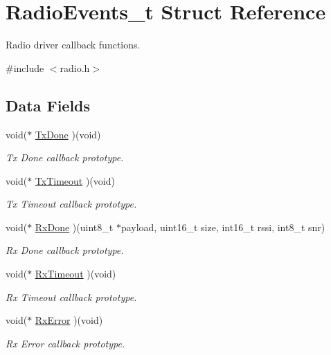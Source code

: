 \hypertarget{structRadioEvents__t}{}\section{Radio\+Events\+\_\+t Struct Reference}
\label{structRadioEvents__t}


Radio driver callback functions.  




{\ttfamily \#include $<$radio.\+h$>$}

\subsection*{Data Fields}
\begin{DoxyCompactItemize}
\item 
void($\ast$ \hyperlink{group__LORA_gafe2bdc503d6c09946dee1b800e2fb3a2}{Tx\+Done} )(void)
\begin{DoxyCompactList}\small\item\em Tx Done callback prototype. \end{DoxyCompactList}\item 
void($\ast$ \hyperlink{group__LORA_ga1f435b15ceae4ce1e44af3d3c5845ffd}{Tx\+Timeout} )(void)
\begin{DoxyCompactList}\small\item\em Tx Timeout callback prototype. \end{DoxyCompactList}\item 
void($\ast$ \hyperlink{group__LORA_ga92665b4b0a07eb2df1b435dcef314b48}{Rx\+Done} )(uint8\+\_\+t $\ast$payload, uint16\+\_\+t size, int16\+\_\+t rssi, int8\+\_\+t snr)
\begin{DoxyCompactList}\small\item\em Rx Done callback prototype. \end{DoxyCompactList}\item 
void($\ast$ \hyperlink{group__LORA_ga1566693134c9ae4bad8a0f90ed72fff2}{Rx\+Timeout} )(void)
\begin{DoxyCompactList}\small\item\em Rx Timeout callback prototype. \end{DoxyCompactList}\item 
void($\ast$ \hyperlink{group__LORA_ga17b9f56c75cbc08de07f5b2a9d234002}{Rx\+Error} )(void)
\begin{DoxyCompactList}\small\item\em Rx Error callback prototype. \end{DoxyCompactList}\item 

\end{DoxyCompactItemize}
